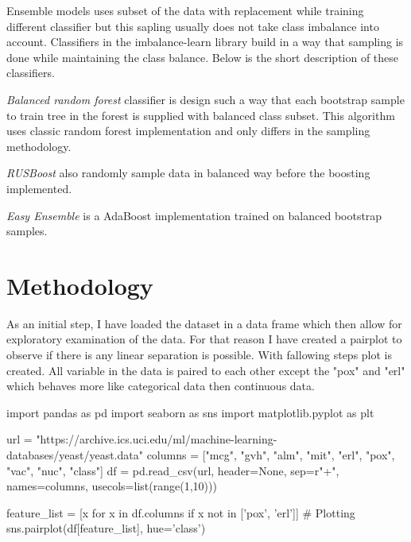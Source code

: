 \documentclass[12pt]{article}
\begin{document}
Ensemble models uses subset of the data with replacement while training different classifier but this sapling usually does not take class imbalance into account. Classifiers in the imbalance-learn library build in a way that sampling is done while maintaining the class balance. Below is the short description of these classifiers.

\textit{Balanced random forest} \cite{rforestbalanced} classifier is design such a way that each bootstrap sample to train tree in the forest is supplied with balanced class subset.
This algorithm uses classic random forest \cite{randomforest} implementation and only differs in the sampling methodology.


\textit{RUSBoost} \cite{rusboost} also randomly sample data in balanced way before the boosting implemented.

\textit{Easy Ensemble} \cite{adaboostbalance} is a AdaBoost \cite{adaboost} implementation trained on balanced bootstrap samples.

\section{Methodology} \label{sec:method}
As an initial step, I have loaded the dataset in a data frame which then allow for exploratory examination of the data. For that reason I have created a pairplot to observe if there is any linear separation is possible. With fallowing steps plot is created. All variable in the data is paired to each other except the "pox" and "erl" which behaves more like categorical data then continuous data.

\begin{python}
import pandas as pd
import seaborn as sns
import matplotlib.pyplot as plt

url = "https://archive.ics.uci.edu/ml/machine-learning-databases/yeast/yeast.data"
columns = ["mcg", "gvh", "alm", "mit", "erl", "pox", "vac", "nuc", "class"]
df = pd.read_csv(url, header=None, sep=r"\s+", names=columns, usecols=list(range(1,10)))

feature_list = [x for x in df.columns if x not in ['pox', 'erl']]
# Plotting
sns.pairplot(df[feature_list], hue='class')
\end{python}
\end{document}
